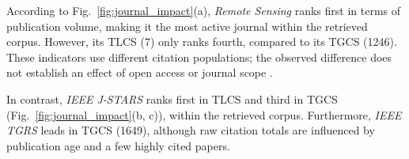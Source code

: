 \documentclass[]{interact}
\theoremstyle{plain}%
\theoremstyle{definition}
\theoremstyle{remark}
\DeclareRobustCommand{\DIFadd}[1]{{\protect\color{DIFaddcolor}\uwave{#1}}}
\DeclareRobustCommand{\DIFdel}[1]{{\protect\color{DIFdelcolor}\sout{#1}}}
\def\DIFadd#1{#1}%
\def\DIFdel#1{}%
\begin{document}
According to Fig.~\ref{fig:journal_impact}(a), \textit{Remote Sensing} ranks first in terms of publication volume, making it the most active journal \DIFdel{in} \DIFadd{within} the \DIFdel{LULC} \DIFdel{research} \DIFdel{domain} \DIFadd{retrieved} \DIFadd{corpus}. However, its TLCS (7) only ranks fourth, \DIFdel{showing} \DIFdel{a} \DIFdel{significant} \DIFdel{discrepancy} compared to its \DIFdel{high} TGCS (1246). \DIFdel{This} \DIFdel{may} \DIFdel{be} \DIFdel{attributed} \DIFdel{to} \DIFdel{its} \DIFdel{status} \DIFdel{as} \DIFadd{These} \DIFadd{indicators} \DIFadd{use} \DIFadd{different} \DIFadd{citation} \DIFadd{populations}\DIFadd{;} \DIFadd{the} \DIFadd{observed} \DIFadd{difference} \DIFadd{does} \DIFadd{not} \DIFadd{establish} an \DIFdel{open-access} \DIFadd{effect} \DIFadd{of} \DIFadd{open} \DIFadd{access} \DIFadd{or} journal \DIFdel{with} \DIFdel{a} \DIFdel{broad} \DIFdel{and} \DIFdel{multidisciplinary} scope \DIFdel{(}\DIFdel{covering} \DIFdel{ecology}\DIFdel{,} \DIFdel{agriculture}\DIFdel{,} \DIFdel{hydrology}\DIFdel{,} \DIFdel{etc}\DIFdel{.}\DIFdel{)}\DIFdel{.} \DIFdel{Consequently}\DIFdel{,} \DIFdel{only} \DIFdel{a} \DIFdel{fraction} \DIFdel{of} \DIFdel{its} \DIFdel{total} \DIFdel{papers}\DIFdel{,} \DIFdel{those} \DIFdel{highly} \DIFdel{aligned} \DIFdel{with} \DIFdel{deep} \DIFdel{learning} \DIFdel{and} \DIFdel{remote} \DIFdel{sensing} \DIFdel{processing}\DIFdel{,} \DIFdel{are} \DIFdel{cited} \DIFdel{within} \DIFdel{this} \DIFdel{local} \DIFdel{sample} \DIFdel{set} \DIFdel{(}\DIFdel{low} \DIFdel{TLCS}\DIFdel{)}\DIFdel{,} \DIFdel{whereas} \DIFdel{its} \DIFdel{wide} \DIFdel{global} \DIFdel{audience} \DIFdel{leads} \DIFdel{to} \DIFdel{high} \DIFdel{cross-disciplinary} \DIFdel{citations} \DIFdel{(}\DIFdel{high} \DIFdel{TGCS}\DIFdel{)}.

In contrast, \textit{IEEE J-STARS} ranks first in TLCS and third in TGCS (Fig.~\ref{fig:journal_impact}(b, c)), \DIFdel{indicating} \DIFdel{that} \DIFdel{its} \DIFdel{publications} \DIFdel{are} \DIFdel{not} \DIFdel{only} \DIFdel{highly} \DIFdel{cited} within the \DIFdel{LULC} \DIFdel{community} \DIFdel{but} \DIFdel{also} \DIFdel{attract} \DIFdel{extensive} \DIFdel{attention} \DIFdel{from} \DIFdel{the} \DIFdel{broader} \DIFdel{scientific} \DIFdel{world} \DIFadd{retrieved} \DIFadd{corpus}. Furthermore, \textit{IEEE TGRS} leads in TGCS (1649), \DIFdel{which} \DIFdel{is} \DIFdel{consistent} \DIFdel{with} \DIFdel{its} \DIFdel{reputation} \DIFdel{as} \DIFdel{one} \DIFdel{of} \DIFdel{the} \DIFdel{oldest} \DIFadd{although} \DIFadd{raw} \DIFadd{citation} \DIFadd{totals} \DIFadd{are} \DIFadd{influenced} \DIFadd{by} \DIFadd{publication} \DIFadd{age} and \DIFdel{most} \DIFdel{prestigious} \DIFdel{top-tier} \DIFdel{journals} \DIFdel{in} \DIFdel{the} \DIFdel{remote} \DIFdel{sensing} \DIFdel{field} \DIFdel{since} \DIFdel{1963} \DIFadd{a} \DIFadd{few} \DIFadd{highly} \DIFadd{cited} \DIFadd{papers}.
\end{document}

